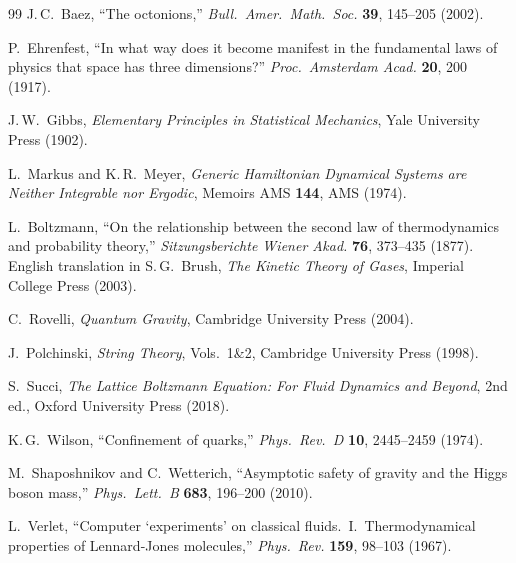 \documentclass[12pt,a4paper]{article}
\begin{document}
\begin{thebibliography}{99}
J.\,C.\ Baez, ``The octonions,'' \textit{Bull.\ Amer.\ Math.\ Soc.} \textbf{39}, 145--205 (2002).

P.\ Ehrenfest, ``In what way does it become manifest in the fundamental laws of physics that space has three dimensions?'' \textit{Proc.\ Amsterdam Acad.} \textbf{20}, 200 (1917).

J.\,W.\ Gibbs, \textit{Elementary Principles in Statistical Mechanics}, Yale University Press (1902).

L.\ Markus and K.\,R.\ Meyer, \textit{Generic Hamiltonian Dynamical Systems are Neither Integrable nor Ergodic}, Memoirs AMS \textbf{144}, AMS (1974).

L.\ Boltzmann, ``On the relationship between the second law of thermodynamics and probability theory,'' \textit{Sitzungsberichte Wiener Akad.} \textbf{76}, 373--435 (1877). English translation in S.\,G.\ Brush, \textit{The Kinetic Theory of Gases}, Imperial College Press (2003).

C.\ Rovelli, \textit{Quantum Gravity}, Cambridge University Press (2004).

J.\ Polchinski, \textit{String Theory}, Vols.\ 1\&2, Cambridge University Press (1998).

S.\ Succi, \textit{The Lattice Boltzmann Equation: For Fluid Dynamics and Beyond}, 2nd ed., Oxford University Press (2018).

K.\,G.\ Wilson, ``Confinement of quarks,'' \textit{Phys.\ Rev.\ D} \textbf{10}, 2445--2459 (1974).

M.\ Shaposhnikov and C.\ Wetterich, ``Asymptotic safety of gravity and the Higgs boson mass,'' \textit{Phys.\ Lett.\ B} \textbf{683}, 196--200 (2010).

L.\ Verlet, ``Computer `experiments' on classical fluids.\ I.\ Thermodynamical properties of Lennard-Jones molecules,'' \textit{Phys.\ Rev.} \textbf{159}, 98--103 (1967).

\end{thebibliography}


\appendix
\end{document}
